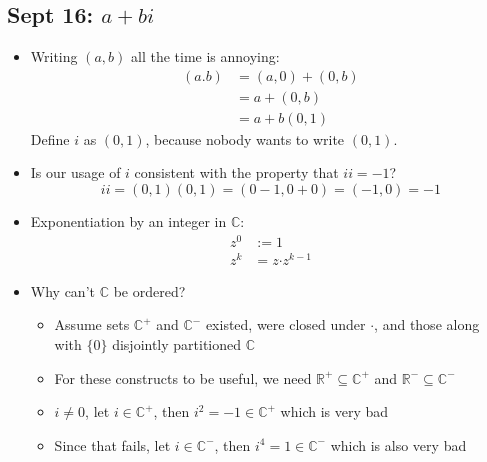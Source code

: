 \documentclass[10pt, oneside]{article}
\newcommand{\R}{\mathbb{R}}
\newcommand{\C}{\mathbb{C}}
\newcommand{\Cdot}{\boldsymbol{\cdot}}
\begin{document}
\subsection{Sept 16: $a+bi$}
\begin{itemize}
    \item Writing $(a,b)$ all the time is annoying:
    \begin{align*}
        (a.b) &= (a,0) + (0,b)\\
        &= a + (0,b)\\
        &= a + b(0,1)
    \end{align*}
    Define $i$ as $(0,1)$, because nobody wants to write $(0,1)$.
    \item Is our usage of $i$ consistent with the property that $ii = -1$?
        \[ii = (0,1)(0,1) = (0-1,0+0) = (-1,0) = -1\]
    \item Exponentiation by an integer in $\C$:
    \begin{align*}
        z^0 &:= 1\\
        z^k &= z \Cdot z^{k-1}
    \end{align*}
    \item Why can't $\C$ be ordered?
    \begin{itemize}
        \item Assume sets $\C^+$ and $\C^-$ existed, were closed under $ \Cdot $, and those along with $\{0\}$ disjointly partitioned $\C$
        \item For these constructs to be useful, we need $\R^+ \subseteq \C^+$ and $\R^- \subseteq \C^-$
        \item $i \neq 0$, let $i \in \C^+$, then $i^2 = -1 \in \C^+$ which is very bad
        \item Since that fails, let $i \in \C^-$, then $i^4 = 1 \in \C^-$ which is also very bad
    \end{itemize}
\end{itemize}
\end{document}
